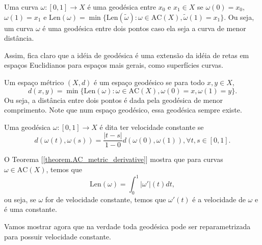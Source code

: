 \begin{definition}[Geodésica]
    Uma curva $\omega:[0,1]\to X$ é uma geodésica entre $x_0$ e $x_1 \in X$ se
    $\omega(0)=x_0$, $\omega(1)=x_1$ e
    $\text{Len}(\omega) = \min\{\text{Len}(\tilde \omega): \omega \in \text{AC}(X)
    , \tilde \omega(1)=x_1\}$.
    Ou seja, um curva $\omega$ é uma geodésica entre dois pontos caso ela seja a curva
    de menor distância.
\end{definition}
Assim, fica claro que a idéia de geodésica é uma extensão da idéia de retas em espaços
Euclidianos para espaços mais gerais, como superfícies curvas. 

\begin{definition}
    Um espaço métrico $(X,d)$ é um espaço geodésico se para todo $x,y \in X$,
    \begin{equation}
        d(x,y) = \min\{\text{Len}(\omega): \omega \in \text{AC}(X), \omega(0)=x, \omega(1)=y\}.
    \end{equation}
    Ou seja, a distância entre dois pontos é dada pela geodésica de menor comprimento.
    Note que num espaço geodésico, essa geodésica sempre existe.
\end{definition}

\begin{definition}
    Uma geodésica $\omega:[0,1]\to X$ é dita ter velocidade constante se
    \begin{equation}
        d(\omega(t), \omega(s)) = \frac{|t-s|}{1 - 0} d(\omega(0),\omega(1)), \forall t,s \in [0,1].
    \end{equation}
\end{definition}

O Teorema [\ref{theorem.AC_metric_derivative}] mostra que para curvas $\omega \in \text{AC}(X)$, temos
que
\begin{equation}
    \text{Len}(\omega) = \int_0^1 |\omega '|(t) dt,
\end{equation}
ou seja, se $\omega$ for de velocidade constante, temos que $\omega'(t)$ é
a velocidade de $\omega$ e é uma constante.

Vamos mostrar agora que na verdade toda geodésica pode ser reparametrizada
para possuir velocidade constante.

